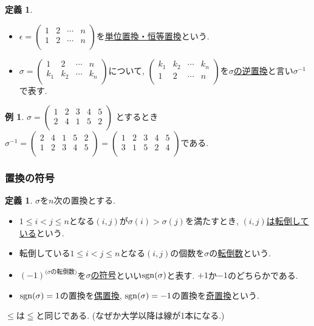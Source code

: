 \documentclass[dvipdfmx,a4paper,11pt]{article} %
\theoremstyle{definition}
\newtheorem{dfn}[thm]{定義}
\newtheorem{exa}[thm]{例}
\begin{document}
    \begin{dfn}
\begin{itemize}
\item $
\epsilon =
  \begin{pmatrix}
 1& 2  &\cdots &n\\
 1& 2  &\cdots &n\\
 \end{pmatrix} $を\underline{単位置換・恒等置換}という.
 \item  
 $ \sigma =
  \begin{pmatrix}
 1& 2  &\cdots &n\\
 k_1& k_2  &\cdots &k_n\\
 \end{pmatrix} 
$について, 
$
  \begin{pmatrix}
 k_1& k_2  &\cdots &k_n\\
 1& 2  &\cdots &n\\
 \end{pmatrix} 
$を\underline{$\sigma$の逆置換}と言い$\sigma^{-1}$で表す.
\end{itemize}
  \end{dfn}

\begin{exa}\cite[例 3.1.2]{O}
$\sigma = 
\begin{pmatrix}
 1& 2  &3 & 4 & 5\\
 2& 4  &1  &5 &2\\
 \end{pmatrix} 
$
とするとき
$
\sigma^{-1}
=
\begin{pmatrix}
 2& 4  &1  &5 &2\\
 1& 2  &3 & 4 & 5\\
 \end{pmatrix} 
 =
 \begin{pmatrix}
 1& 2  &3 & 4 & 5\\
 3& 1 &5  &2 &4\\
 \end{pmatrix} 
 \text{である.}
$
\end{exa}

\subsubsection{置換の符号}

\begin{dfn}
$\sigma$を$n$次の置換とする. 
\begin{itemize}
\item $1 \le i < j \le n$となる$(i, j)$が$\sigma(i)>\sigma(j)$を満たすとき, \underline{$(i,j)$は転倒している}という. 
\item 転倒している$1 \le i < j \le n$となる$(i, j)$の個数を$\sigma$の\underline{転倒数}という.
\item $(-1)^{\text{($\sigma$の転倒数)}}$を\underline{$\sigma$の符号}といい${\rm sgn}(\sigma)$と表す. $+1$か$-1$のどちらかである.
\item ${\rm sgn}(\sigma)=1$の置換を\underline{偶置換}, ${\rm sgn}(\sigma)=-1$の置換を\underline{奇置換}という. 
\end{itemize}
\end{dfn}
$\le$は$\leqq$と同じである. (なぜか大学以降は線が1本になる.)
\end{document}
